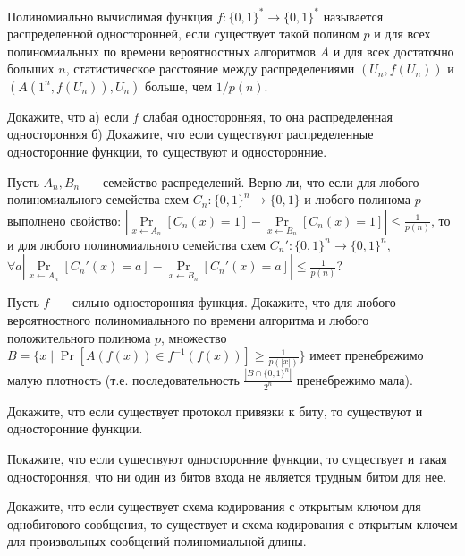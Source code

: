 \begin{task}
    Полиномиально вычислимая функция $f: \{0, 1\}^* \to  \{0, 1\}^*$ называется
    распределенной односторонней, если существует такой полином $p$ и для всех
    полиномиальных по времени вероятностных алгоритмов $A$ и для всех достаточно
    больших $n$, статистическое расстояние между распределениями $(U_n, f(U_n))$ и
    $(A(1^n, f(U_n)), U_n)$ больше, чем $1 / p(n)$.
    
    Докажите, что а) если $f$ слабая односторонняя, то она распределенная
    односторонняя б) Докажите, что если существуют распределенные односторонние
    функции, то существуют и односторонние.
\end{task}

\begin{task}
    Пусть $A_n, B_n$~--- семейство распределений. Верно ли, что если для любого
    полиномиального семейства схем $C_n: \{0, 1\}^{n} \to \{0, 1\}$ и любого полинома
    $p$ выполнено свойство:
    $|\Pr\limits_{x \gets A_n}[C_n(x) = 1] - \Pr\limits_{x \gets B_n}[C_n(x) = 1]|
    \le \frac{1}{p(n)}$, то и для любого полиномиального семейства схем
    $C_n': \{0, 1\}^{n} \to \{0, 1\}^{n}$,
    $\forall a |\Pr\limits_{x \gets A_n}[C_n'(x) = a] - \Pr\limits_{x \gets B_n}[C_n'(x) = a]|
    \le \frac{1}{p(n)}$?
\end{task}

\begin{task}
    Пусть $f$~--- сильно односторонняя функция. Докажите, что для любого
    вероятностного полиномиального по времени алгоритма и любого положительного
    полинома $p$, множество $B = \{x \mid \Pr[A(f(x)) \in f^{-1}(f(x))] \ge
    \frac{1}{p(|x|)} \}$ имеет пренебрежимо малую плотность (т.е. последовательность
    $\frac{|B \cap \{0, 1\}^n|}{2^n}$ пренебрежимо мала).
\end{task}

\begin{task}
    Докажите, что если существует протокол привязки к биту, то существуют и
    односторонние функции.
\end{task}

\begin{task}
    Покажите, что если существуют односторонние функции, то существует и такая
    односторонняя, что ни один из битов входа не является трудным битом для нее.
\end{task}

\begin{task}
    Докажите, что если существует схема кодирования с открытым ключом для
    однобитового сообщения, то существует и схема кодирования с открытым ключем для
    произвольных сообщений полиномиальной длины.
\end{task}

